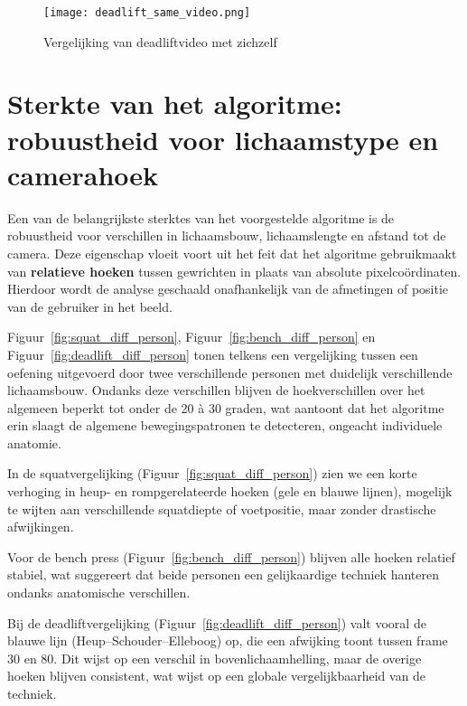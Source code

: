 \begin{figure}[H]
\centering
\texttt{[image: deadlift\_same\_video.png]}
\caption{Vergelijking van deadliftvideo met zichzelf}
\label{fig:deadlift_same}
\end{figure}

\section{Sterkte van het algoritme: robuustheid voor lichaamstype en camerahoek}

Een van de belangrijkste sterktes van het voorgestelde algoritme is de robuustheid voor verschillen in lichaamsbouw, lichaamslengte en afstand tot de camera. 
Deze eigenschap vloeit voort uit het feit dat het algoritme gebruikmaakt van \textbf{relatieve hoeken} tussen gewrichten in plaats van absolute pixelcoördinaten. 
Hierdoor wordt de analyse geschaald onafhankelijk van de afmetingen of positie van de gebruiker in het beeld.

\medskip

Figuur~\ref{fig:squat_diff_person}, Figuur~\ref{fig:bench_diff_person} en Figuur~\ref{fig:deadlift_diff_person} tonen telkens een vergelijking tussen een oefening uitgevoerd door twee verschillende personen met duidelijk verschillende lichaamsbouw. 
Ondanks deze verschillen blijven de hoekverschillen over het algemeen beperkt tot onder de 20 à 30 graden, wat aantoont dat het algoritme erin slaagt de algemene bewegingspatronen te detecteren, ongeacht individuele anatomie.

In de squatvergelijking (Figuur~\ref{fig:squat_diff_person}) zien we een korte verhoging in heup- en rompgerelateerde hoeken (gele en blauwe lijnen), mogelijk te wijten aan verschillende squatdiepte of voetpositie, maar zonder drastische afwijkingen.

\medskip

Voor de bench press (Figuur~\ref{fig:bench_diff_person}) blijven alle hoeken relatief stabiel, wat suggereert dat beide personen een gelijkaardige techniek hanteren ondanks anatomische verschillen.

\medskip

Bij de deadliftvergelijking (Figuur~\ref{fig:deadlift_diff_person}) valt vooral de blauwe lijn (Heup–Schouder–Elleboog) op, die een afwijking toont tussen frame 30 en 80. Dit wijst op een verschil in bovenlichaamhelling, maar de overige hoeken blijven consistent, wat wijst op een globale vergelijkbaarheid van de techniek.

